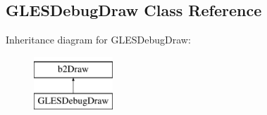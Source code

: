 \hypertarget{class_g_l_e_s_debug_draw}{\subsection{G\-L\-E\-S\-Debug\-Draw Class Reference}
\label{d7/da9/class_g_l_e_s_debug_draw}
}
Inheritance diagram for G\-L\-E\-S\-Debug\-Draw\-:\begin{figure}[H]
\begin{center}
\leavevmode
\includegraphics[height=2.000000cm]{d7/da9/class_g_l_e_s_debug_draw}
\end{center}
\end{figure}
